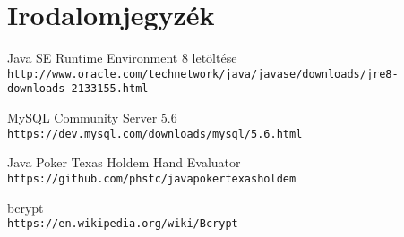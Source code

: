 \chapter{Irodalomjegyzék}

\begin{thebibliography}{9}
Java SE Runtime Environment 8 letöltése
\\\texttt{http://www.oracle.com/technetwork/java/javase/downloads/jre8-downloads-2133155.html}

MySQL Community Server 5.6
\\\texttt{https://dev.mysql.com/downloads/mysql/5.6.html}

Java Poker Texas Holdem Hand Evaluator
\\\texttt{https://github.com/phstc/javapokertexasholdem}

bcrypt
\\\texttt{https://en.wikipedia.org/wiki/Bcrypt}

\end{thebibliography}
